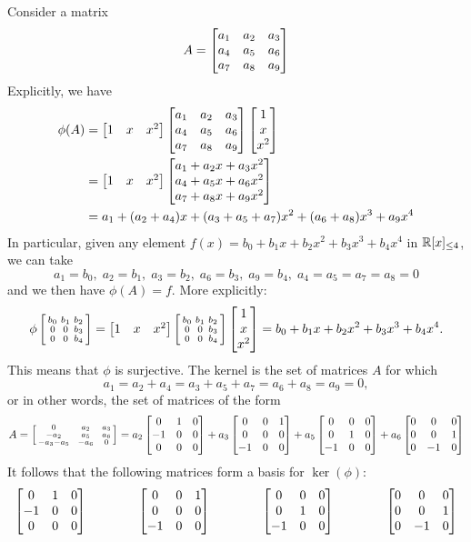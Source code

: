  Consider a matrix
 \[ A = \left[\begin{matrix} a_1&a_2&a_3\\ a_4&a_5&a_6 \\ a_7&a_8&a_9 \end{matrix}\right] \]
 Explicitly, we have
 \begin{align*}
  \phi(A)
  &= \left[\begin{matrix} 1 & x & x^2\end{matrix}\right]
     \left[\begin{matrix} a_1&a_2&a_3\\ a_4&a_5&a_6 \\ a_7&a_8&a_9 \end{matrix}\right]
     \left[\begin{matrix} 1 \\ x \\ x^2\end{matrix}\right] \\
  &= \left[\begin{matrix} 1 & x & x^2 \end{matrix}\right]
     \left[\begin{matrix} a_1 + a_2x + a_3 x^2 \\
          a_4 + a_5x + a_6 x^2 \\
          a_7 + a_8x + a_9 x^2 \end{matrix}\right] \\
  &= a_1 + (a_2+a_4)x + (a_3+a_5+a_7)x^2 + (a_6+a_8)x^3 + a_9x^4
 \end{align*}
 In particular, given any element $f(x)=b_0+b_1x+b_2x^2+b_3x^3+b_4x^4$ in
 ${\mathbb{R}}[x]_{\leq 4}$, we can take
 \[ a_1=b_0,\; a_2=b_1,\; a_3=b_2,\; a_6=b_3,\; a_9=b_4,\;
    a_4=a_5=a_7=a_8=0
 \]
 and we then have $\phi(A)=f$.  More explicitly:
 \[ \phi\left[\begin{smallmatrix} b_0 & b_1 & b_2 \\ 0 & 0 & b_3 \\ 0 & 0 & b_4 \end{smallmatrix}\right]
    = \left[\begin{matrix} 1 & x & x^2\end{matrix}\right]
      \left[\begin{smallmatrix} b_0 & b_1 & b_2 \\ 0 & 0 & b_3 \\ 0 & 0 & b_4 \end{smallmatrix}\right]
      \left[\begin{matrix} 1 \\ x \\ x^2 \end{matrix}\right]
    = b_0 + b_1 x + b_2 x^2 + b_3 x^3 + b_4 x^4.
 \]
 This means that $\phi$ is
 surjective.  The kernel is the set of matrices $A$ for which
 \[ a_1 = a_2+a_4 = a_3+a_5+a_7 = a_6+a_8 = a_9 = 0, \]
 or in other words, the set of matrices of the form
 {\tiny \[ A = \left[\begin{smallmatrix} 0 &\; & a_2 &\; & a_3 \\
             -a_2 &\; & a_5 &\; & a_6 \\
             -a_3-a_5 &\; & -a_6 &\; & 0 \end{smallmatrix}\right] =
   a_2 \left[\begin{matrix}  0&1&0\\ -1&0&0\\ 0&0&0 \end{matrix}\right] +
   a_3 \left[\begin{matrix} 0&0&1\\ 0&0&0\\ -1&0&0 \end{matrix}\right] +
   a_5 \left[\begin{matrix} 0&0&0\\ 0&1&0\\ -1&0&0 \end{matrix}\right] +
   a_6 \left[\begin{matrix} 0&0&0\\ 0&0&1\\ 0&-1&0 \end{matrix}\right]
 \]}
 It follows that the following matrices form a basis for
 $\ker(\phi)$:
 {\tiny \[
  \left[\begin{matrix} 0&1&0\\ -1&0&0\\ 0&0&0 \end{matrix}\right] \hspace{4em}
  \left[\begin{matrix} 0&0&1\\ 0&0&0\\ -1&0&0 \end{matrix}\right] \hspace{4em}
  \left[\begin{matrix} 0&0&0\\ 0&1&0\\ -1&0&0 \end{matrix}\right] \hspace{4em}
  \left[\begin{matrix} 0&0&0\\ 0&0&1\\ 0&-1&0 \end{matrix}\right]
 \]}
\EndDeferredSolution

